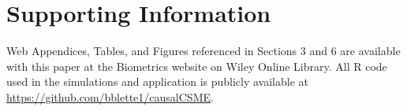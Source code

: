 \documentclass[useAMS,usenatbib,referee]{biom}
\begin{document}








\section*{Supporting Information}

Web Appendices, Tables, and Figures referenced in Sections 3 and 6 are available with this paper at the Biometrics website on Wiley Online Library. All R code used in the simulations and application is publicly available at \href{https://github.com/bblette1/causalCSME}{https://github.com/bblette1/causalCSME}.\vspace*{-8pt}

\label{lastpage}
\end{document}
